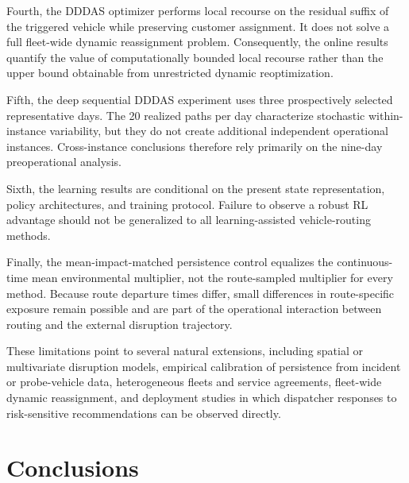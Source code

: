 \documentclass[preprint,12pt]{elsarticle}
\newcommand{\1}{\mathbf{1}}
\begin{document}
Fourth, the DDDAS optimizer performs local recourse on the residual suffix of
the triggered vehicle while preserving customer assignment. It does not solve
a full fleet-wide dynamic reassignment problem. Consequently, the online results
quantify the value of computationally bounded local recourse rather than the
upper bound obtainable from unrestricted dynamic reoptimization.

Fifth, the deep sequential DDDAS experiment uses three prospectively selected
representative days. The 20 realized paths per day characterize stochastic
within-instance variability, but they do not create additional independent
operational instances. Cross-instance conclusions therefore rely primarily on
the nine-day preoperational analysis.

Sixth, the learning results are conditional on the present state representation,
policy architectures, and training protocol. Failure to observe a robust RL
advantage should not be generalized to all learning-assisted vehicle-routing
methods.

Finally, the mean-impact-matched persistence control equalizes the
continuous-time mean environmental multiplier, not the route-sampled multiplier
for every method. Because route departure times differ, small differences in
route-specific exposure remain possible and are part of the operational
interaction between routing and the external disruption trajectory.

These limitations point to several natural extensions, including spatial or
multivariate disruption models, empirical calibration of persistence from
incident or probe-vehicle data, heterogeneous fleets and service agreements,
fleet-wide dynamic reassignment, and deployment studies in which dispatcher
responses to risk-sensitive recommendations can be observed directly.




























\section{Conclusions}
\label{sec:conclusions}
\end{document}
